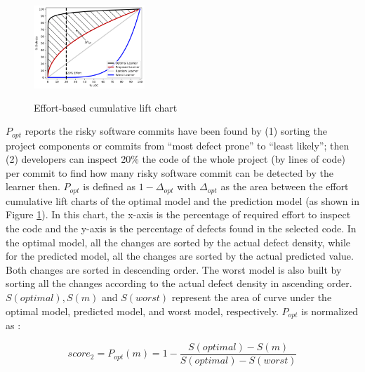 \documentclass[sigconf,review, anonymous]{acmart}
\begin{document}
\begin{figure}
\vspace{-12pt}
\hspace{-25pt}
\includegraphics[width=1.65in, height=1.5in]{popt.png}
\vspace{-13pt}
\caption{Effort-based cumulative lift chart}\label{fig:popt}
\vspace{-20pt}
\end{figure} 

$P_{opt}$ reports the risky software commits have been found by (1) sorting the project components or commits from ``most defect prone'' to ``least likely''; then (2) developers can inspect 20\% the code of the whole project (by lines of code) per commit to find how many risky software commit can be detected by the learner then.  $P_{opt}$ is defined as $1 - \Delta_{opt}$ with $\Delta_{opt}$ as the area between the effort cumulative lift charts of the optimal model and the prediction model (as shown in Figure \ref{fig:popt}). In this chart, the x-axis is the
percentage of required effort to inspect the code and the y-axis is
the percentage of defects found in the selected code. In the optimal
model, all the changes are sorted by the actual defect density, while for the predicted model, all the changes are sorted by the actual predicted value. Both changes are sorted in descending order. The worst model is also built by sorting all the changes according
to the actual defect density in ascending order.
$S(optimal), S(m)$ and $S(worst)$ represent the area of curve
under the optimal model, predicted model, and worst model, respectively. $P_{opt}$ is normalized as  \cite{yang16effort, kamei12_jit, monden13cost}:

\begin{equation}
 \mathit{score_2} = \mathit{P_{opt}(m)} = 1 - \frac{S(optimal) - S(m)}{S(optimal) - S(worst)}
\end{equation}

\end{document}
